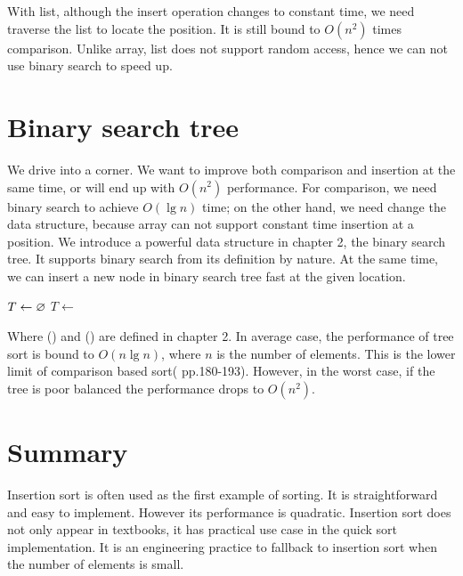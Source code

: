 \documentclass[b5paper]{article}
\begin{document}
With list, although the insert operation changes to constant time, we need traverse the list to locate the position. It is still bound to $O(n^2)$ times comparison. Unlike array, list does not support random access, hence we can not use binary search to speed up.

\begin{Exercise}
\end{Exercise}

\section{Binary search tree}

We drive into a corner. We want to improve both comparison and insertion at the same time, or will end up with $O(n^2)$ performance. For comparison, we need binary search to achieve $O(\lg n)$ time; on the other hand, we need change the data structure, because array can not support constant time insertion at a position. We introduce a powerful data structure in chapter 2, the binary search tree. It supports binary search from its definition by nature. At the same time, we can insert a new node in binary search tree fast at the given location.

\begin{algorithmic}[1]
  \State $T \gets \varnothing$
    \State $T \gets $ 
  \EndFor
  \State \Return {}
\EndFunction
\end{algorithmic}

Where () and () are defined in chapter 2. In average case, the performance of tree sort is bound to $O(n \lg n)$, where $n$ is the number of elements. This is the lower limit of comparison based sort(\cite{Knuth} pp.180-193). However, in the worst case, if the tree is poor balanced the performance drops to $O(n^2)$.

\section{Summary}
Insertion sort is often used as the first example of sorting. It is straightforward and easy to implement. However its performance is quadratic. Insertion sort does not only appear in textbooks, it has practical use case in the quick sort implementation. It is an engineering practice to fallback to insertion sort when the number of elements is small.
\end{document}
